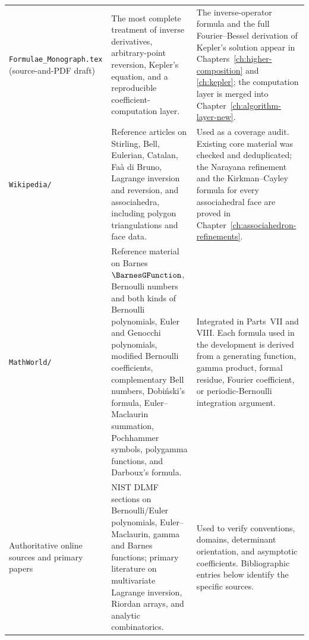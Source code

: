 \documentclass[11pt,a4paper,oneside,openany]{book}
\theoremstyle{definition}
\theoremstyle{remark}
\begin{document}
\begin{longtable}{>{\raggedright\arraybackslash}p{}
                  >{\raggedright\arraybackslash}p{}
                  >{\raggedright\arraybackslash}p{}}
\nolinkurl{Formulae_Monograph.tex} (source-and-PDF draft)
& The most complete treatment of inverse derivatives, arbitrary-point reversion,
  Kepler's equation, and a reproducible coefficient-computation layer.
& The inverse-operator formula and the full Fourier--Bessel derivation of Kepler's
  solution appear in Chapters~\ref{ch:higher-composition} and \ref{ch:kepler};
  the computation layer is merged into Chapter~\ref{ch:algorithm-layer-new}.\\[1ex]

\nolinkurl{Wikipedia/}
& Reference articles on Stirling, Bell, Eulerian, Catalan, Fa\`a di Bruno,
  Lagrange inversion and reversion, and associahedra, including polygon
  triangulations and face data.
& Used as a coverage audit.  Existing core material was checked and deduplicated;
  the Narayana refinement and the Kirkman--Cayley formula for every associahedral
  face are proved in Chapter~\ref{ch:associahedron-refinements}.\\[1ex]

\nolinkurl{MathWorld/}
& Reference material on Barnes $\BarnesGFunction$, Bernoulli numbers and both kinds of Bernoulli
  polynomials, Euler and Genocchi polynomials, modified Bernoulli coefficients,
  complementary Bell numbers, Dobi\'nski's formula, Euler--Maclaurin summation,
  Pochhammer symbols, polygamma functions, and Darboux's formula.
& Integrated in Parts~VII and VIII.  Each formula used in the development is
  derived from a generating function, gamma product, formal residue, Fourier
  coefficient, or periodic-Bernoulli integration argument.\\[1ex]

Authoritative online sources and primary papers
& NIST DLMF sections on Bernoulli/Euler polynomials, Euler--Maclaurin, gamma and
  Barnes functions; primary literature on multivariate Lagrange inversion,
  Riordan arrays, and analytic combinatorics.
& Used to verify conventions, domains, determinant orientation, and asymptotic
  coefficients.  Bibliographic entries below identify the specific sources.\\
\end{longtable}
\renewcommand{\arraystretch}{1}
\end{document}
